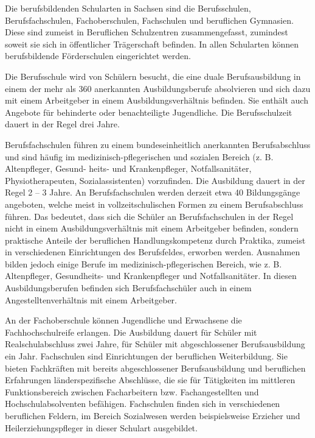 Die berufsbildenden Schularten in Sachsen sind die Berufsschulen, Berufsfachschulen, Fachoberschulen, Fachschulen und beruflichen Gymnasien. Diese sind zumeist in Beruflichen Schulzentren zusammengefasst, zumindest soweit sie sich in öffentlicher Trägerschaft befinden. In allen Schularten können berufsbildende Förderschulen eingerichtet werden.

Die Berufsschule wird von Schülern besucht, die eine duale Berufsausbildung in einem der mehr als 360 anerkannten Ausbildungsberufe absolvieren und sich dazu mit einem Arbeitgeber in einem Ausbildungsverhältnis befinden. Sie enthält auch Angebote für behinderte oder benachteiligte Jugendliche. Die Berufsschulzeit dauert in der Regel drei Jahre. 

Berufsfachschulen führen zu einem bundeseinheitlich anerkannten Berufsabschluss und sind häufig im medizinisch-pflegerischen und sozialen Bereich (z. B. Altenpfleger, Gesund- heits- und Krankenpfleger, Notfallsanitäter, Physiotherapeuten, Sozialassistenten) vorzufinden. Die Ausbildung dauert in der Regel 2 -- 3 Jahre. An Berufsfachschulen werden derzeit etwa 40 Bildungsgänge angeboten, welche meist in vollzeitschulischen Formen zu einem Berufsabschluss führen. Das bedeutet, dass sich die Schüler an Berufsfachschulen in der Regel nicht in einem Ausbildungsverhältnis mit einem Arbeitgeber befinden, sondern praktische Anteile der beruflichen Handlungskompetenz durch Praktika, zumeist in verschiedenen Einrichtungen des Berufsfeldes, erworben werden. Ausnahmen bilden jedoch einige Berufe im medizinisch-pflegerischen Bereich, wie z. B. Altenpfleger, Gesundheits- und Krankenpfleger und Notfallsanitäter. In diesen Ausbildungsberufen befinden sich Berufsfachschüler auch in einem Angestelltenverhältnis mit einem Arbeitgeber.
 
An der Fachoberschule können Jugendliche und Erwachsene die Fachhochschulreife erlangen. Die Ausbildung dauert für Schüler mit Realschulabschluss zwei Jahre, für Schüler mit abgeschlossener Berufsausbildung ein Jahr. 
Fachschulen sind Einrichtungen der beruflichen Weiterbildung. Sie bieten Fachkräften mit bereits abgeschlossener Berufsausbildung und beruflichen Erfahrungen länderspezifische Abschlüsse, die sie für Tätigkeiten im mittleren Funktionsbereich zwischen Facharbeitern bzw. Fachangestellten und Hochschulabsolventen befähigen. Fachschulen finden sich in verschiedenen beruflichen Feldern, im Bereich Sozialwesen werden beispielsweise Erzieher und Heilerziehungspfleger in dieser Schulart ausgebildet. 

